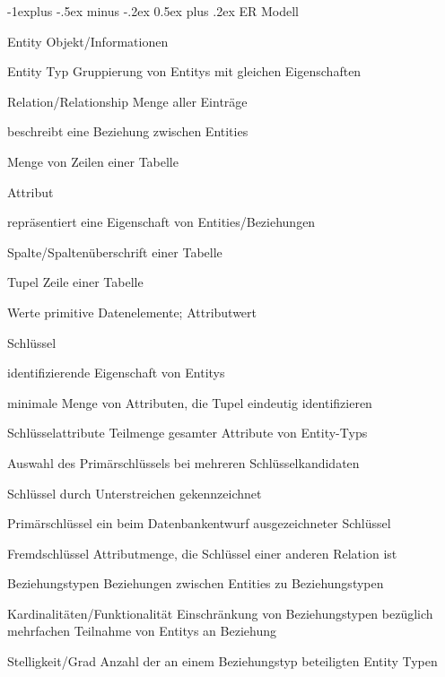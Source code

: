 \documentclass[a4paper]{article}
\makeatletter
\renewcommand{\subsection}{\@startsection{subsection}{2}{0mm}%
                                {-1explus -.5ex minus -.2ex}%
                                {0.5ex plus .2ex}%
                                {\normalfont\normalsize\bfseries}}
\makeatother
\begin{document}
\begin{multicols}{3}
    \subsection{ER Modell}
    \begin{description*}
        \item[Entity] Objekt/Informationen
        \item[Entity Typ] Gruppierung von Entitys mit gleichen Eigenschaften
        \item[Relation/Relationship] Menge aller Einträge
        \begin{itemize*}
            \item beschreibt eine Beziehung zwischen Entities
            \item Menge von Zeilen einer Tabelle
        \end{itemize*}
        \item[Attribut]
        \begin{itemize*}
            \item repräsentiert eine Eigenschaft von Entities/Beziehungen
            \item Spalte/Spaltenüberschrift einer Tabelle
        \end{itemize*}
        \item[Tupel] Zeile einer Tabelle
        \item[Werte] primitive Datenelemente; Attributwert
        \item[Schlüssel]
        \begin{itemize*}
            \item identifizierende Eigenschaft von Entitys
            \item minimale Menge von Attributen, die Tupel eindeutig identifizieren
        \end{itemize*}
        \item[Schlüsselattribute] Teilmenge gesamter Attribute von Entity-Typs
        \begin{itemize*}
            \item Auswahl des Primärschlüssels bei mehreren Schlüsselkandidaten
            \item Schlüssel durch Unterstreichen gekennzeichnet
        \end{itemize*}
        \item[Primärschlüssel] ein beim Datenbankentwurf ausgezeichneter Schlüssel
        \item[Fremdschlüssel] Attributmenge, die Schlüssel einer anderen Relation ist
        \item[Beziehungstypen] Beziehungen zwischen Entities zu Beziehungstypen
        \item[Kardinalitäten/Funktionalität] Einschränkung von Beziehungstypen bezüglich mehrfachen Teilnahme von Entitys an Beziehung
        \item[Stelligkeit/Grad] Anzahl der an einem Beziehungstyp beteiligten Entity Typen
    \end{description*}


\end{multicols}
\end{document}
